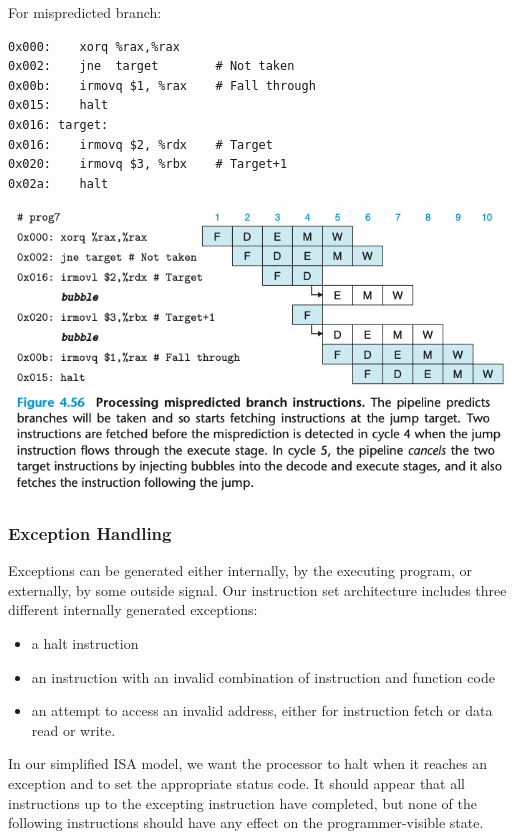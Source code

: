 \documentclass[11pt]{article}
\begin{document}
\begin{enumerate}
For mispredicted branch:\\
\begin{verbatim}
0x000:    xorq %rax,%rax
0x002:    jne  target        # Not taken
0x00b:    irmovq $1, %rax    # Fall through
0x015:    halt
0x016: target:
0x016:    irmovq $2, %rdx    # Target
0x020:    irmovq $3, %rbx    # Target+1
0x02a:    halt
\end{verbatim}

\begin{center}
\includegraphics[width=.9\linewidth]{pics/figure4.56-processing-mispredicted-branch-instructions.png}
\end{center}
\end{enumerate}


\subsubsection{Exception Handling}
\label{sec:org35a77b4}

Exceptions can be generated either internally, by the executing program, or externally, by some outside signal. Our instruction set architecture includes three different internally generated exceptions:\\
\begin{itemize}
\item a halt instruction\\
\item an instruction with an invalid combination of instruction and function code\\
\item an attempt to access an invalid address, either for instruction fetch or data read or write.\\
\end{itemize}

In our simplified ISA model, we want the processor to halt when it reaches an exception and to set the appropriate status code. It should appear that all instructions up to the excepting instruction have completed, but none of the following instructions should have any effect on the programmer-visible state.\\
\end{document}

